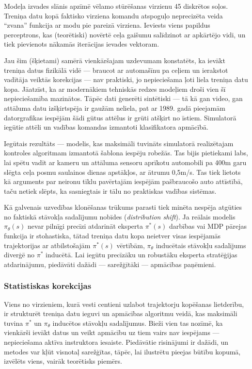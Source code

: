 \documentclass[12pt, a4paper]{article}
\numberwithin{equation}{section} %
\begin{document}
Modeļa izvades slānis apzīmē vēlamo stūrēšanas virzienu 45 diskrētos soļos. Treniņa datu kopā faktisko virziena komandu atspoguļo neprecizēta veida ``zvana'' funkcija ar modu pie pareizā virziena. Ieviests viens papildus perceptrons, kas (teorētiski) novērtē ceļa gaišumu salīdzinot ar apkārtējo vidi, un tiek pievienots nākamās iterācijas ievades vektoram.

Jau šim (šķietami) samērā vienkāršajam uzdevumam konstatēts, ka ievākt treniņa datus fizikālā vidē --- braucot ar automašīnu pa ceļiem un ierakstot vadītāja veiktās korekcijas --- nav praktiski, jo nepieciešama ļoti liela treniņa datu kopa. Jāatzīst, ka ar modernākiem tehniskās redzes modeļiem droši vien šī nepieciešamība mazinātos. Tāpēc dati ģenerēti sintētiski --- tā kā gan video, gan attāluma datu izšķirtspēja ir gaužām neliela, pat ar 1989. gadā pieejamām datorgrafikas iespējām šādi gūtus attēlus ir grūti atšķirt no īstiem. Simulatorā iegūtie attēli un vadības komandas izmantoti klasifikatora apmācībā.

Iegūtais rezultāts --- modelis, kas maksimāli tuvināts simulatorā realizētajam kontroles algoritmam izmantotā šablona iespēju robežās. Tas bijis pietiekami labs, lai spētu vadīt ar kameru un attāluma sensoru aprīkotu automobili pa 400m garu slēgta ceļa posmu saulainos dienas apstākļos, ar ātrumu 0,5m/s. Tas tiek lietots kā arguments par neironu tīklu pavērtajām iespējām pašbraucošo auto attīstībā, taču netiek slēpts, ka sasniegtais ir tālu no praktiskas vadības sistēmas.

Kā galvenais uzvedības klonēšanas trūkums parasti tiek minēta nespēja atgūties no faktiskā stāvokļa sadalījumu nobīdes\cite{attia2018global} (\textit{distribution shift}). Ja reālais modelis $\pi_{\theta}(s)$ nevar pilnīgi precīzi atdarināt eksperta $\pi^*(s)$ darbības vai MDP pārejas funkcija ir stohastiska, tātad treniņa datu kopa neietver visas iespējamās trajektorijas ar atbilstošajām $\pi^*(s)$ vērtībām, $\pi_{\theta}$ inducētais stāvokļu sadalījums diverģē no $\pi^*$ inducētā. Lai iegūtu precīzāku un robustāku eksperta stratēģijas atdarinājumu, piedāvāti dažādi --- sarežģītāki --- apmācības paņēmieni.


\subsubsection{Statistiskas korekcijas}

Viens no virzieniem, kurā vesti centieni uzlabot trajektorju kopēšanas lietderību, ir strukturēt treniņa datu ieguvi un apmācības algoritmu veidā, kas maksimāli tuvina $\pi^*$ un $\pi_{\theta}$ inducētos stāvokļu sadalījumus. Bieži vien tas nozīmē, ka vienkārši ievākt datus un veikt apmācību uz tiem vairs nav iespējams --- nepieciešama aktīva instruktora iesaiste. Piedāvātie risinājumi ir dažādi, un metodes var kļūt visnotaļ sarežģītas\cite{attia2018global}, tāpēc, lai ilustrētu pieejas būtību kopumā, izvēlēts viens, vairāk teorētisks piemērs.
\end{document}

